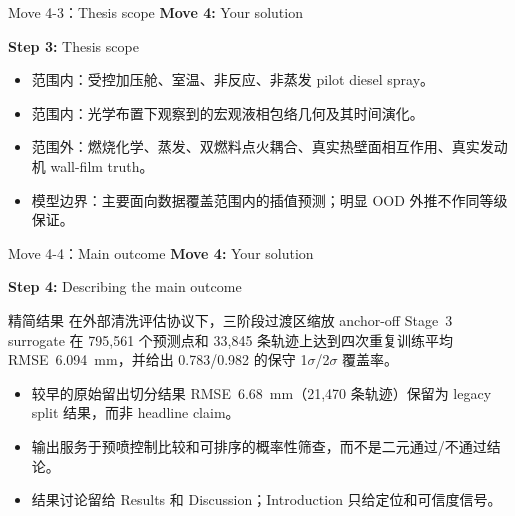 \documentclass[aspectratio=169,11pt]{beamer}
\newcommand{\movetag}[2]{\textbf{Move #1:} #2}
\newcommand{\steptag}[2]{\textbf{Step #1:} #2}
\begin{document}
\begin{frame}{Move 4-3：Thesis scope}
\small
\movetag{4}{Your solution}

\vspace{0.5em}
\steptag{3}{Thesis scope}

\vspace{0.8em}
\begin{itemize}
  \item 范围内：受控加压舱、室温、非反应、非蒸发 pilot diesel spray。
  \item 范围内：光学布置下观察到的宏观液相包络几何及其时间演化。
  \item 范围外：燃烧化学、蒸发、双燃料点火耦合、真实热壁面相互作用、真实发动机 wall-film truth。
  \item 模型边界：主要面向数据覆盖范围内的插值预测；明显 OOD 外推不作同等级保证。
\end{itemize}
\end{frame}

\begin{frame}{Move 4-4：Main outcome}
\footnotesize
\movetag{4}{Your solution}

\vspace{0.5em}
\steptag{4}{Describing the main outcome}

\vspace{0.5em}
\begin{block}{精简结果}
在外部清洗评估协议下，三阶段过渡区缩放 anchor-off Stage~3 surrogate 在 795{,}561 个预测点和 33{,}845 条轨迹上达到四次重复训练平均 RMSE~\SI{6.094}{mm}，并给出 0.783/0.982 的保守 1$\sigma$/2$\sigma$ 覆盖率。
\end{block}

\vspace{0.4em}
\begin{itemize}
  \item 较早的原始留出切分结果 RMSE~\SI{6.68}{mm}（21{,}470 条轨迹）保留为 legacy split 结果，而非 headline claim。
  \item 输出服务于预喷控制比较和可排序的概率性筛查，而不是二元通过/不通过结论。
  \item 结果讨论留给 Results 和 Discussion；Introduction 只给定位和可信度信号。
\end{itemize}
\end{frame}
\end{document}
